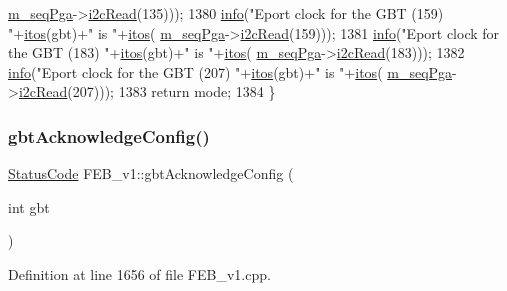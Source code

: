 \begin{DoxyCode}
      \hyperlink{classFEB__v1_a6c7804ac86796f233a8393043adf2e77}{m\_seqPga}->\hyperlink{classSeqPGA_a7cd344df2be99f3a02b487f80e87b27e}{i2cRead}(135)));
1380   \hyperlink{classObject_a644fd329ea4cb85f54fa6846484b84a8}{info}(\textcolor{stringliteral}{"Eport clock for the GBT (159) "}+\hyperlink{Tools_8h_af330027dbdafb9a30768b3613c553e60}{itos}(gbt)+\textcolor{stringliteral}{" is "}+\hyperlink{Tools_8h_af330027dbdafb9a30768b3613c553e60}{itos}(
      \hyperlink{classFEB__v1_a6c7804ac86796f233a8393043adf2e77}{m\_seqPga}->\hyperlink{classSeqPGA_a7cd344df2be99f3a02b487f80e87b27e}{i2cRead}(159)));
1381   \hyperlink{classObject_a644fd329ea4cb85f54fa6846484b84a8}{info}(\textcolor{stringliteral}{"Eport clock for the GBT (183) "}+\hyperlink{Tools_8h_af330027dbdafb9a30768b3613c553e60}{itos}(gbt)+\textcolor{stringliteral}{" is "}+\hyperlink{Tools_8h_af330027dbdafb9a30768b3613c553e60}{itos}(
      \hyperlink{classFEB__v1_a6c7804ac86796f233a8393043adf2e77}{m\_seqPga}->\hyperlink{classSeqPGA_a7cd344df2be99f3a02b487f80e87b27e}{i2cRead}(183)));
1382   \hyperlink{classObject_a644fd329ea4cb85f54fa6846484b84a8}{info}(\textcolor{stringliteral}{"Eport clock for the GBT (207) "}+\hyperlink{Tools_8h_af330027dbdafb9a30768b3613c553e60}{itos}(gbt)+\textcolor{stringliteral}{" is "}+\hyperlink{Tools_8h_af330027dbdafb9a30768b3613c553e60}{itos}(
      \hyperlink{classFEB__v1_a6c7804ac86796f233a8393043adf2e77}{m\_seqPga}->\hyperlink{classSeqPGA_a7cd344df2be99f3a02b487f80e87b27e}{i2cRead}(207)));
1383   \textcolor{keywordflow}{return} mode; 
1384 \}
\end{DoxyCode}
\mbox{\label{classFEB__v1_af7e7f3cb7269dc811866bc42585cf020}} 
\subsubsection{\texorpdfstring{gbt\+Acknowledge\+Config()}{gbtAcknowledgeConfig()}}
{\footnotesize\ttfamily \hyperlink{classStatusCode}{Status\+Code} F\+E\+B\+\_\+v1\+::gbt\+Acknowledge\+Config (\begin{DoxyParamCaption}\item[{int}]{gbt }\end{DoxyParamCaption})}



Definition at line 1656 of file F\+E\+B\+\_\+v1.\+cpp.




